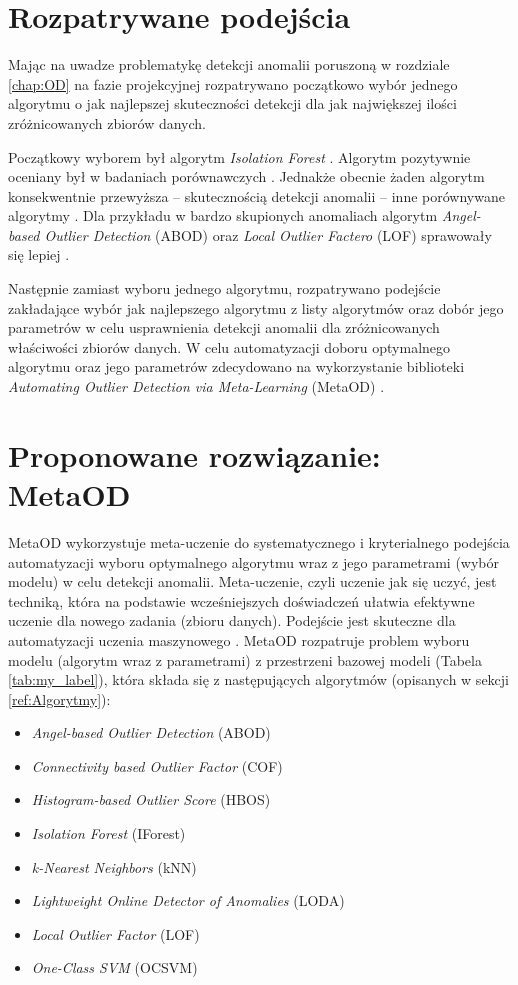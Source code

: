 \section{Rozpatrywane podejścia}
Mając na uwadze problematykę detekcji anomalii poruszoną w rozdziale \ref{chap:OD} na fazie projekcyjnej rozpatrywano początkowo wybór jednego algorytmu o jak najlepszej skuteczności detekcji dla jak największej ilości zróżnicowanych zbiorów danych. 

Początkowy wyborem był algorytm \textit{Isolation Forest} \cite{iforest}. Algorytm pozytywnie oceniany był w badaniach porównawczych \cite{emmott2015meta,aggarwal2017ens}. Jednakże obecnie żaden algorytm konsekwentnie przewyższa -- skutecznością detekcji anomalii -- inne porównywane algorytmy \cite{aggarwal2017ens}. Dla przykładu w bardzo skupionych anomaliach algorytm \textit{Angel-based Outlier Detection} (ABOD)  \cite{abod} oraz \textit{Local Outlier Factero} (LOF) \cite{lof} sprawowały się lepiej \cite{emmott2015meta}. 

Następnie zamiast wyboru jednego algorytmu, rozpatrywano podejście zakładające wybór jak najlepszego algorytmu z listy algorytmów oraz dobór jego parametrów w celu usprawnienia detekcji anomalii dla zróżnicowanych właściwości zbiorów danych. 
W celu automatyzacji doboru optymalnego algorytmu oraz jego parametrów zdecydowano na wykorzystanie biblioteki \textit{Automating Outlier Detection via Meta-Learning} (MetaOD) \cite{zhao2020metaod}. 

\section{Proponowane rozwiązanie: MetaOD}
\label{sec:MetaOD}
MetaOD wykorzystuje meta-uczenie do systematycznego i kryterialnego podejścia automatyzacji wyboru optymalnego algorytmu wraz z jego parametrami (wybór modelu) w celu detekcji anomalii. Meta-uczenie, czyli uczenie jak się uczyć, jest techniką, która na podstawie wcześniejszych doświadczeń ułatwia efektywne uczenie dla nowego zadania (zbioru danych). Podejście jest skuteczne dla automatyzacji uczenia maszynowego \cite{vanschoren2018meta}. MetaOD rozpatruje problem wyboru modelu (algorytm wraz z parametrami) z przestrzeni bazowej modeli (Tabela \ref{tab:my_label}), która składa się z następujących algorytmów (opisanych w sekcji \ref{ref:Algorytmy}):
\begin{itemize}
    \item \textit{Angel-based Outlier Detection} (ABOD)
    \item \textit{Connectivity based Outlier Factor} (COF)
    \item \textit{Histogram-based Outlier Score} (HBOS)
    \item \textit{Isolation Forest} (IForest)
    \item \textit{k-Nearest Neighbors} (kNN)
    \item \textit{Lightweight Online Detector of Anomalies} (LODA)
    \item \textit{Local Outlier Factor} (LOF)
    \item \textit{One-Class SVM} (OCSVM)
\end{itemize} 

